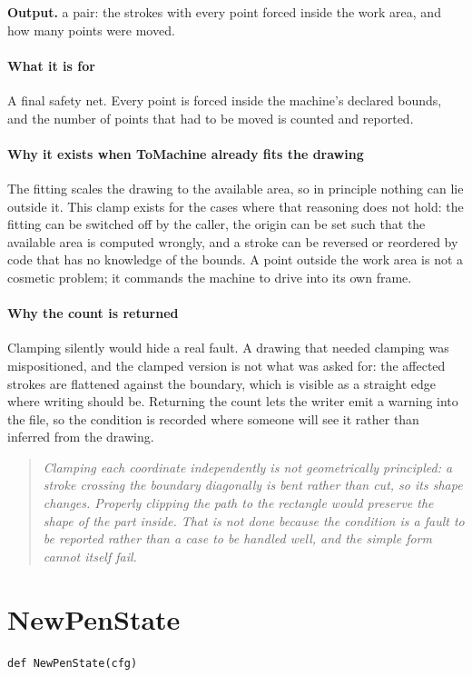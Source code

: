 \noindent\textbf{Output.} a pair: the strokes with every point forced inside the work area, and how many points were moved.


\paragraph{What it is for}
A final safety net. Every point is forced inside the machine's declared bounds, and the number of points that had to be moved is counted and reported.


\paragraph{Why it exists when ToMachine already fits the drawing}
The fitting scales the drawing to the available area, so in principle nothing can lie outside it. This clamp exists for the cases where that reasoning does not hold: the fitting can be switched off by the caller, the origin can be set such that the available area is computed wrongly, and a stroke can be reversed or reordered by code that has no knowledge of the bounds. A point outside the work area is not a cosmetic problem; it commands the machine to drive into its own frame.


\paragraph{Why the count is returned}
Clamping silently would hide a real fault. A drawing that needed clamping was mispositioned, and the clamped version is not what was asked for: the affected strokes are flattened against the boundary, which is visible as a straight edge where writing should be. Returning the count lets the writer emit a warning into the file, so the condition is recorded where someone will see it rather than inferred from the drawing.


\begin{quote}\small\itshape Clamping each coordinate independently is not geometrically principled: a stroke crossing the boundary diagonally is bent rather than cut, so its shape changes. Properly clipping the path to the rectangle would preserve the shape of the part inside. That is not done because the condition is a fault to be reported rather than a case to be handled well, and the simple form cannot itself fail.\end{quote}

\section{NewPenState}
\begin{lstlisting}[style=sig]
def NewPenState(cfg)
\end{lstlisting}

